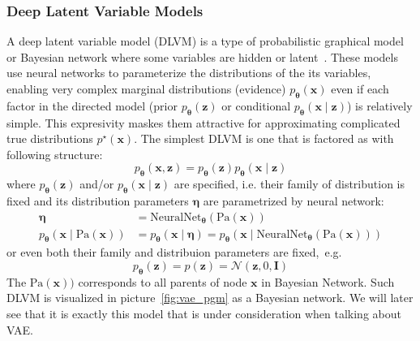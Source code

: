 \subsubsection{Deep Latent Variable Models}
A deep latent variable model (DLVM) is a type of probabilistic graphical model or Bayesian network where some variables are hidden or latent~\cite{intro-vae-2019}.
These models use neural networks to parameterize the distributions of the its variables, enabling very complex marginal distributions (evidence)
$p_{\boldsymbol{\theta}}(\mathbf{x})$ even if each factor in the directed model (prior $p_{\boldsymbol{\theta}}(\mathbf{z})$ or conditional $p_{\boldsymbol{\theta}}(\mathbf{x}\mid \mathbf{z})$)
is relatively simple. This expresivity maskes them attractive for approximating complicated true distributions $p^\star(\mathbf{x})$. 
The simplest DLVM is one that is factored as with following structure:
$$
p_{\boldsymbol{\theta}}(\mathbf{x},\mathbf{z}) = p_{\boldsymbol{\theta}}(\mathbf{z})p_{\boldsymbol{\theta}}(\mathbf{x}\mid \mathbf{z})
$$
where $p_{\boldsymbol{\theta}}(\mathbf{z})$ and/or $p_{\boldsymbol{\theta}}(\mathbf{x}\mid \mathbf{z})$ are specified, i.e. their family of distribution is fixed and its distribution
parameters $\boldsymbol{\eta}$ are parametrized by neural network:
\begin{align*}
\boldsymbol{\eta} &= \mathrm{NeuralNet}_{\boldsymbol{\theta}}(\text{Pa}(\mathbf{x})) \\
p_{\boldsymbol{\theta}}(\mathbf{x}\mid \text{Pa}(\mathbf{x})) &= p_{\boldsymbol{\theta}}(\boldsymbol{x}\mid \boldsymbol{\eta}) =  p_{\boldsymbol{\theta}}(\boldsymbol{x} \mid \mathrm{NeuralNet}_{\boldsymbol{\theta}}(\text{Pa}(\mathbf{x})))
\end{align*}
or even both their family and distribuion parameters are fixed,~e.g. 
$$
p_{\boldsymbol{\theta}}(\mathbf{z}) = p(\mathbf{z}) = \mathcal{N}(\mathbf{z},0,\mathbf{I})
$$
The $\text{Pa}(\mathbf{x}))$ corresponds to all parents of node $\mathbf{x}$ in Bayesian Network.
Such DLVM is visualized in picture~\ref{fig:vae_pgm} as a Bayesian network. We will later see that 
it is exactly this model that is under consideration when talking about VAE. 

